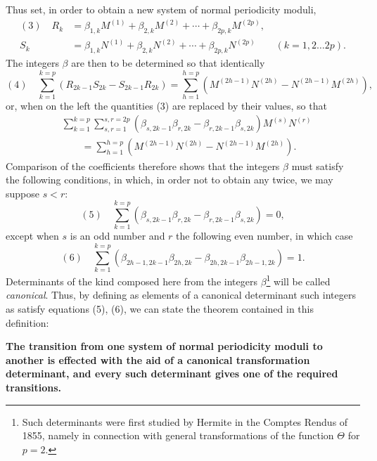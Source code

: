 \documentclass[10pt]{article}
\begin{document}
Thus set, in order to obtain a new system of normal periodicity moduli,
\[
\begin{aligned}
(3)\quad
R_k&=\beta_{1,k}M^{(1)}+\beta_{2,k}M^{(2)}+\cdots+\beta_{2p,k}M^{(2p)},\\
S_k&=\beta_{1,k}N^{(1)}+\beta_{2,k}N^{(2)}+\cdots+\beta_{2p,k}N^{(2p)}
\qquad (k=1,2\ldots2p).
\end{aligned}
\]
The integers \(\beta\) are then to be determined so that identically
\[
(4)\quad
\sum_{k=1}^{k=p}(R_{2k-1}S_{2k}-S_{2k-1}R_{2k})
=\sum_{h=1}^{h=p}\left(M^{(2h-1)}N^{(2h)}-N^{(2h-1)}M^{(2h)}\right),
\]
or, when on the left the quantities (3) are replaced by their values, so that
\[
\begin{aligned}
&\sum_{k=1}^{k=p}\sum_{s,r=1}^{s,r=2p}
(\beta_{s,2k-1}\beta_{r,2k}-\beta_{r,2k-1}\beta_{s,2k})M^{(s)}N^{(r)}\\
&\hspace{2em}=\sum_{h=1}^{h=p}\left(M^{(2h-1)}N^{(2h)}-N^{(2h-1)}M^{(2h)}\right).
\end{aligned}
\]
Comparison of the coefficients therefore shows that the integers \(\beta\) must satisfy the following conditions, in which, in order not to obtain any twice, we may suppose \(s<r\):
\[
(5)\quad
\sum_{k=1}^{k=p}\left(\beta_{s,2k-1}\beta_{r,2k}-\beta_{r,2k-1}\beta_{s,2k}\right)=0,
\]
except when \(s\) is an odd number and \(r\) the following even number, in which case
\[
(6)\quad
\sum_{k=1}^{k=p}\left(\beta_{2h-1,2k-1}\beta_{2h,2k}-\beta_{2h,2k-1}\beta_{2h-1,2k}\right)=1.
\]
Determinants of the kind composed here from the integers \(\beta\)\footnote{Such determinants were first studied by Hermite in the Comptes Rendus of 1855, namely in connection with general transformations of the function \(\Theta\) for \(p=2\).} will be called \emph{canonical}. Thus, by defining as elements of a canonical determinant such integers as satisfy equations (5), (6), we can state the theorem contained in this definition:

\begin{center}
\textbf{The transition from one system of normal periodicity moduli to another is effected with the aid of a canonical transformation determinant, and every such determinant gives one of the required transitions.}
\end{center}
\end{document}
